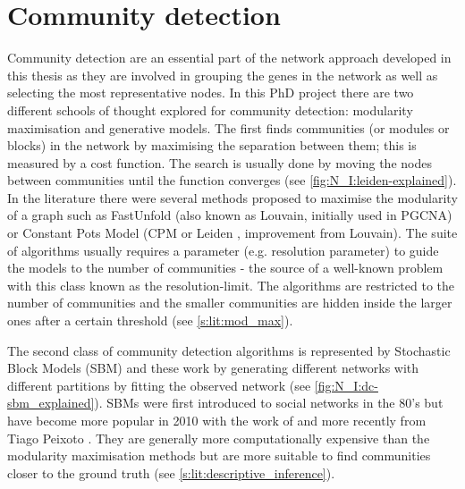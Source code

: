 \section{Community detection} \label{s:lit:comm_detect}

\vspace{3mm}
\vspace{3mm}

Community detection are an essential part of the network approach developed in this thesis as they are involved in grouping the genes in the network as well as selecting the most representative nodes. In this PhD project there are two different schools of thought explored for community detection: modularity maximisation and generative models. The first finds communities (or modules or blocks) in the network by maximising the separation between them; this is measured by a cost function. The search is usually done by moving the nodes between communities until the function converges (see \cref{fig:N_I:leiden-explained}). In the literature there were several methods proposed to maximise the modularity of a graph such as FastUnfold \citet{Blondel2008-ik} (also known as Louvain, initially used in PGCNA) or Constant Pots Model (CPM or Leiden \citet{Traag2019-ne}, improvement from Louvain). The suite of algorithms usually requires a parameter (e.g. resolution parameter) to guide the models to the number of communities - the source of a well-known problem with this class known as the resolution-limit. The algorithms are restricted to the number of communities and the smaller communities are hidden inside the larger ones after a certain threshold (see \cref{s:lit:mod_max}).

The second class of community detection algorithms is represented by Stochastic Block Models (SBM) and these work by generating different networks with different partitions by fitting the observed network (see \cref{fig:N_I:dc-sbm_explained}). SBMs were first introduced to social networks \citet{Holland1983-eu} in the 80's but have become more popular in 2010 with the work of \citet{Karrer2011-si} and more recently from Tiago Peixoto \cite{Peixoto2014-ls,Peixoto2017-ua,Peixoto2018-ot,Peixoto2019-fg,Peixoto2023-mw,Peixoto2024-mu}. They are generally more computationally expensive than the modularity maximisation methods but are more suitable to find communities closer to the ground truth (see \cref{s:lit:descriptive_inference}).

